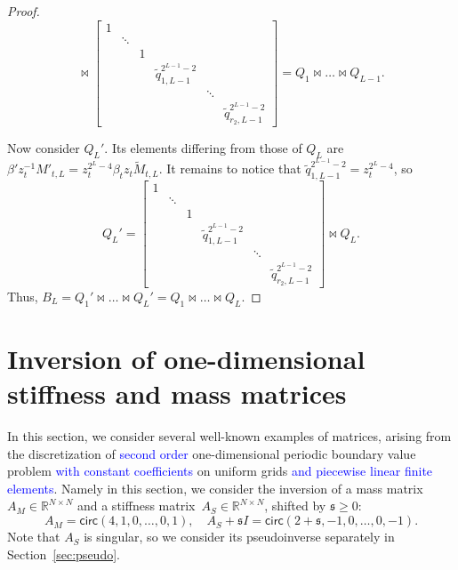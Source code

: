 \documentclass[a4paper]{article}
\newcommand{\LL}{L}
\newcommand{\mass}{A_M}
\newcommand{\MMother}{\widetilde{M}}
\newcommand{\bbeta}{\beta'}
\newcommand{\lap}{A_S}
\newcommand{\qq}{\widetilde{q}}
\newcommand{\shift}{\mathfrak{s}}
\begin{document}
\begin{proof}
\[\Join
\begin{bmatrix}
    1 &        &   &                         &        & \\
      & \ddots &   &                         &        & \\
      &        & 1 &                         &        & \\
      &        &   & \qq_{1,\LL-1}^{2^{\LL-1}-2}             &        & \\
      &        &   &                         & \ddots & \\
      &        &   &                         &        & \qq_{r_2,\LL-1}^{2^{\LL-1}-2}
\end{bmatrix}
=
Q_1\Join \dots \Join Q_{\LL-1}.
\]

Now consider $Q_{\LL}'$.
Its elements differing from those of $Q_L$ are 
$\bbeta z_t^{-1} M'_{t,\LL} = z_t^{2^\LL-4} \beta_t z_t \MMother_{t,\LL}$.
It remains to notice that $\qq_{1,\LL-1}^{2^{\LL-1}-2} = z_t^{2^\LL-4}$, so
\[
Q_{\LL}' = 
\begin{bmatrix}
    1 &        &   &                         &        & \\
      & \ddots &   &                         &        & \\
      &        & 1 &                         &        & \\
      &        &   & \qq_{1,\LL-1}^{2^{\LL-1}-2}             &        & \\
      &        &   &                         & \ddots & \\
      &        &   &                         &        & \qq_{r_2,\LL-1}^{2^{\LL-1}-2}
\end{bmatrix}
\Join
Q_{\LL}.
\]
Thus, $B_L = Q_1'\Join \dots \Join Q_{\LL}' = Q_1 \Join \dots \Join Q_{\LL}$.
\end{proof}






\section{Inversion of one-dimensional stiffness and mass matrices} \label{sec:examples}

In this section, we consider several well-known examples of matrices, arising from the discretization of \textcolor{blue}{second order} one-dimensional  periodic boundary value problem \textcolor{blue}{with constant coefficients}
on uniform grids \textcolor{blue}{and piecewise linear finite elements}.
Namely in this section, we consider the inversion of a mass matrix $\mass\in \mathbb{R}^{N \times N}$ and a stiffness matrix~$\lap\in \mathbb{R}^{N \times N}$, {\color{blue} shifted by $\shift\geq 0$:}
\[
   \mass = \mathsf{circ}(4,1,0,\dots,0,1), \quad\lap + \shift I = \mathsf{circ}(2+\shift,-1,0,\dots,0,-1).
\]
Note that $\lap$ is singular, so we consider its pseudoinverse separately in Section~\ref{sec:pseudo}.
\end{document}
